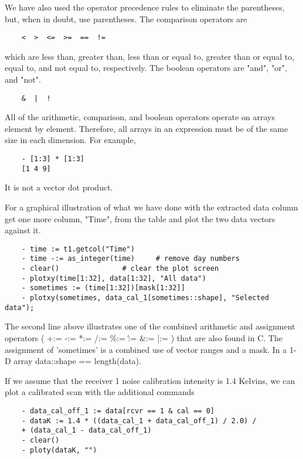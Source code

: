 We have also used the operator precedence rules to eliminate the
parentheses, but, when in doubt, use parentheses. The comparison operators
are

\begin{verbatim}
	<  >  <=  >=  ==  !=
\end{verbatim}

which are less than, greater than, less than or equal to, greater than or
equal to, equal to, and not equal to, respectively.  The boolean operators
are "and", "or", and "not".

\begin{verbatim}
	&  |  !
\end{verbatim}

All of the arithmetic, comparison, and boolean operators operate on arrays
element by element.  Therefore, all arrays in an expression must be of the
same size in each dimension.  For example,

\begin{verbatim}
	- [1:3] * [1:3]
	[1 4 9]
\end{verbatim}

It is not a vector dot product.

    For a graphical illustration of what we have done with the extracted
data column get one more column, "Time", from the table and plot the two
data vectors against it.

\begin{verbatim}
	- time := t1.getcol("Time")
	- time -:= as_integer(time)		# remove day numbers
	- clear()				# clear the plot screen
	- plotxy(time[1:32], data[1:32], "All data")
	- sometimes := (time[1:32])[mask[1:32]]
	- plotxy(sometimes, data_cal_1[sometimes::shape], "Selected data");
\end{verbatim}

The second line above illustrates one of the combined arithmetic and
assignment operators ( +:= -:= *:= /:= \%:= \^:= \&:= |:= ) that are also
found in C.  The assignment of 'sometimes' is a combined use of vector
ranges and a mask.  In a 1-D array data::shape == length(data).

    If we assume that the receiver 1 noise calibration intensity is 1.4
Kelvins, we can plot a calibrated scan with the additional commands

\begin{verbatim}
	- data_cal_off_1 := data[rcvr == 1 & cal == 0]
	- dataK := 1.4 * ((data_cal_1 + data_cal_off_1) / 2.0) /
	+ (data_cal_1 - data_cal_off_1)
	- clear()
	- ploty(dataK, "")
\end{verbatim}

